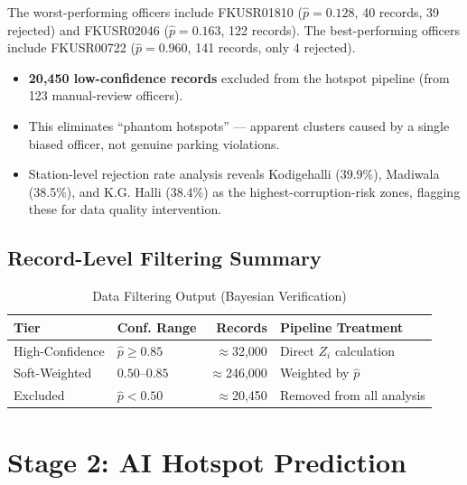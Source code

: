 \documentclass[12pt,a4paper]{article}
\begin{document}
The worst-performing officers include FKUSR01810 ($\hat{p} = 0.128$, 40 records, 39 rejected) and FKUSR02046 ($\hat{p} = 0.163$, 122 records). The best-performing officers include FKUSR00722 ($\hat{p} = 0.960$, 141 records, only 4 rejected).

\begin{tcolorbox}[resultbox, title={Data Cleaning Impact}]
\begin{itemize}[leftmargin=1.5em]
    \item \textbf{20,450 low-confidence records} excluded from the hotspot pipeline (from 123 manual-review officers).
    \item This eliminates ``phantom hotspots'' — apparent clusters caused by a single biased officer, not genuine parking violations.
    \item Station-level rejection rate analysis reveals Kodigehalli (39.9\%), Madiwala (38.5\%), and K.G. Halli (38.4\%) as the highest-corruption-risk zones, flagging these for data quality intervention.
\end{itemize}
\end{tcolorbox}

\subsection{Record-Level Filtering Summary}

\begin{table}[H]
\centering
\caption{Data Filtering Output (Bayesian Verification)}
\begin{tabular}{llrp{5cm}}
\toprule
\textbf{Tier} & \textbf{Conf. Range} & \textbf{Records} & \textbf{Pipeline Treatment} \\
\midrule
High-Confidence & $\hat{p} \geq 0.85$ & $\approx$32,000 & Direct $Z_i$ calculation \\
Soft-Weighted & $0.50$--$0.85$ & $\approx$246,000 & Weighted by $\hat{p}$ \\
Excluded & $\hat{p} < 0.50$ & $\approx$20,450 & Removed from all analysis \\
\bottomrule
\end{tabular}
\end{table}

\section{Stage 2: AI Hotspot Prediction}
\end{document}
